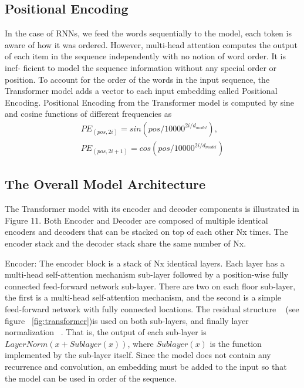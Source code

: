 \subsection{Positional Encoding}
In the case of RNNs, we feed the words sequentially to the model, each token is aware of how it was ordered. However, multi-head attention computes the output of each item in the sequence independently with no notion of word order. It is inef- ficient to model the sequence information without any special order or position. To account for the order of the words in the input sequence, the Transformer model adds a vector to each input embedding called Positional Encoding. Positional Encoding from the Transformer model is computed by sine and cosine functions of different frequencies as 
\begin{equation}
	\begin{aligned}
	PE_{(pos,2i)} = sin(pos/10000^{2i/d_{model}}),\\
	PE_{(pos,2i+1)} = cos(pos/10000^{2i/d_{model}})
	\end{aligned}
	\label{equ:position_embedding}
\end{equation}

\subsection{The Overall Model Architecture}
The Transformer model with its encoder and decoder components is illustrated in Figure 11. Both Encoder and Decoder are composed of multiple identical encoders and decoders that can be stacked on top of each other Nx times. The encoder stack and the decoder stack share the same number of Nx.

Encoder: The encoder block is a stack of Nx identical layers. Each layer has a multi-head self-attention mechanism sub-layer followed by a position-wise fully connected feed-forward network sub-layer. There are two on each floor sub-layer, the first is a multi-head self-attention mechanism, and the second is a simple feed-forward network with fully connected locations. The residual structure ~\cite{He_2016_CVPR} (see figure ~\ref{fig:transformer})is used on both sub-layers, and finally layer normalization ~\cite{ba2016layer}. That is, the output of each sub-layer is $LayerNorm(x + Sublayer(x))$, where $Sublayer(x)$ is the function implemented by the sub-layer itself. Since the model does not contain any recurrence and convolution, an embedding must be added to the input so that the model can be used in order of the sequence.

